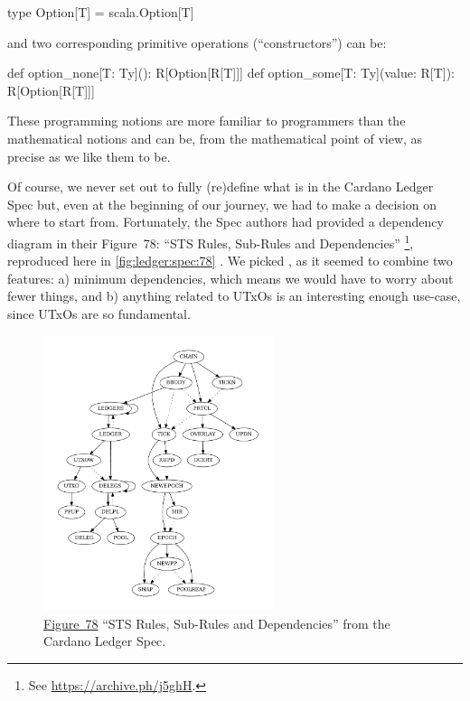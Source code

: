 \documentclass[11pt]{article}
\renewcommand{\vref}[1]{\autoref{#1} \vpageref{#1}}{}
\begin{document}
\begin{ScalaBlockSimple}
type Option[T] = scala.Option[T]
\end{ScalaBlockSimple}

\noindent and two corresponding primitive operations (``constructors'') can be:

\begin{ScalaBlockSimple}
  def option_none[T: Ty](): R[Option[R[T]]]
  def option_some[T: Ty](value: R[T]): R[Option[R[T]]]
\end{ScalaBlockSimple}

\noindent These programming notions are more familiar to programmers than the mathematical notions and can be, from the mathematical point of view, as precise as we like them to be.


Of course, we never set out to fully (re)define what is in the Cardano Ledger Spec but, even at the beginning of our journey, we had to make a decision on where to start from. Fortunately, the Spec authors had provided a dependency diagram in their Figure~78: ``STS Rules, Sub-Rules and Dependencies''%
\footnote{See \href{https://archive.ph/j5ghH}{https://archive.ph/j5ghH}.}, reproduced here in \vref{fig:ledger:spec:78}. We picked , as it seemed to combine two features: a) minimum dependencies, which means we would have to worry about fewer things, and b) anything related to \textsf{UTxOs} is an interesting enough use-case, since \textsf{UTxOs} are so fundamental.

\begin{figure}[tb]
\centering
\includegraphics[width=0.6\textwidth]{rules}
\caption{\href{https://hydra.iohk.io/build/18363060/download/1/ledger-spec.pdf\#figure.78}{Figure~78} ``STS Rules, Sub-Rules and Dependencies'' from the Cardano Ledger Spec.}
\label{fig:ledger:spec:78}
\end{figure}
\end{document}
